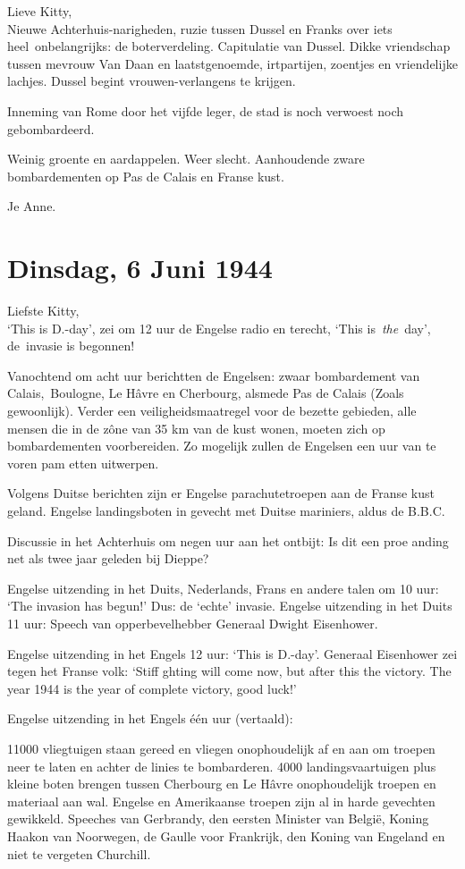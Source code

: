 \documentclass{book}
\begin{document}
Lieve Kitty,\\Nieuwe Achterhuis-narigheden, ruzie tussen Dussel en
Franks over iets heel~onbelangrijks: de boterverdeling. Capitulatie van
Dussel. Dikke vriendschap tussen mevrouw Van Daan en laatstgenoemde,
irtpartijen, zoentjes en vriendelijke lachjes. Dussel begint
vrouwen-verlangens te krijgen.

Inneming van Rome door het vijfde leger, de stad is noch verwoest noch
gebombardeerd.

Weinig groente en aardappelen. Weer slecht. Aanhoudende zware
bombardementen op Pas de Calais en Franse kust.

Je Anne.

\chapter{Dinsdag, 6 Juni 1944}

Liefste Kitty,\\`This is D.-day', zei om 12 uur de Engelse radio en
terecht, `This is~\emph{the}~day', de~invasie is begonnen!

Vanochtend om acht uur berichtten de Engelsen: zwaar bombardement van
Calais,~Boulogne, Le Hâvre en Cherbourg, alsmede Pas de Calais (Zoals
gewoonlijk). Verder een veiligheidsmaatregel voor de bezette gebieden,
alle mensen die in de zône van 35 km van de kust wonen, moeten zich op
bombardementen voorbereiden. Zo mogelijk zullen de Engelsen een uur van
te voren pam etten uitwerpen.

Volgens Duitse berichten zijn er Engelse parachutetroepen aan de Franse
kust geland. Engelse landingsboten in gevecht met Duitse mariniers,
aldus de B.B.C.

Discussie in het Achterhuis om negen uur aan het ontbijt: Is dit een
proe anding net als twee jaar geleden bij Dieppe?

Engelse uitzending in het Duits, Nederlands, Frans en andere talen om 10
uur: `The invasion has begun!' Dus: de `echte' invasie. Engelse
uitzending in het Duits 11 uur: Speech van opperbevelhebber Generaal
Dwight Eisenhower.

Engelse uitzending in het Engels 12 uur: `This is D.-day'. Generaal
Eisenhower zei tegen het Franse volk: `Stiff ghting will come now, but
after this the victory. The year 1944 is the year of complete victory,
good luck!'

Engelse uitzending in het Engels één uur (vertaald):

11000 vliegtuigen staan gereed en vliegen onophoudelijk af en aan om
troepen neer te laten en achter de linies te bombarderen. 4000
landingsvaartuigen plus kleine boten brengen tussen Cherbourg en Le
Hâvre onophoudelijk troepen en materiaal aan wal. Engelse en Amerikaanse
troepen zijn al in harde gevechten gewikkeld. Speeches van Gerbrandy,
den eersten Minister van België, Koning Haakon van Noorwegen, de Gaulle
voor Frankrijk, den Koning van Engeland en niet te vergeten Churchill.
\end{document}
